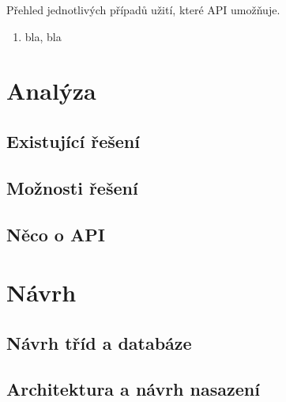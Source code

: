 \documentclass[thesis=B,czech]{FITthesis}[2012/06/26]
\begin{document}

Přehled jednotlivých případů užití, které API umožňuje.

\begin{enumerate}
\item bla, bla
\end{enumerate}

\chapter{Analýza}

\section{Existující řešení}


\section{Možnosti řešení}


\section{Něco o API}


\chapter{Návrh}

\section{Návrh tříd a databáze}


\section{Architektura a návrh nasazení}
\end{document}

